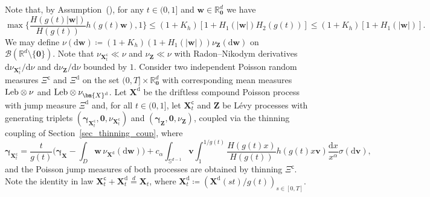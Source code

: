 \documentclass[en,oneside,bbfont,article]{amsart}
\theoremstyle{remark}
\theoremstyle{definition}
\theoremstyle{definition}
\newcommand\N{\mathbb{N}}
\newcommand\Sp{\mathbb{S}}
\newcommand\R{\mathbb{R}}
\newcommand\1{\mathds{1}}
\newcommand{\Borel}{\mathcal{B}}
\newcommand{\Leb}{\text{\normalfont Leb}}
\renewcommand\le{\leqslant}
\newcommand\eqd{\overset{d}{=}}
\newcommand\co{\mathsf{c}}
\newcommand{\D}{\mathrm{d}}
\begin{document}
Note that, by Assumption~(), for any $t\in(0,1]$ and $\bm{w}\in\R^d_{\bm0}$ we have
\begin{equation*}
\max\bigg\{\frac{H(g(t)|\bm{w}|)}{H(g(t))}h(g(t)\bm{w}),1\bigg\} 
\le (1+K_h)[1+H_1(|\bm{w}|)H_2(g(t))] 
\le (1+K_h)[1+H_1(|\bm{w}|)].
\end{equation*}
We may define $\nu(\D\bm{w})\coloneqq (1+K_h) (1+ H_1(|\bm{w}|))\nu_{\bm{Z}} (\D\bm{w})$ on $\Borel(\R^d\setminus\{\bm0\})$. Note that $\nu_{\bm{X}_t^\co}\ll\nu$ and $\nu_{\bm{Z}}\ll\nu$ with Radon--Nikodym derivatives $\D\nu_{\bm X_t^\co}/\D\nu$ and $\D\nu_{\bm Z}/\D\nu$ bounded by $1$. Consider two independent Poisson random measures $\Xi^\co$ %
and $\Xi^\D$ on the set $(0,T]\times \R^d_{\bm0}$ with corresponding mean measures $\Leb\otimes \nu$ and $\Leb\otimes \nu_{\bm{X}^\D}$. Let $\bm{X}^\D$ be the driftless compound Poisson process with jump measure $\Xi^\D$ and, for all $t\in(0,1]$, let $\bm{X}^\co_t$ and $\bm{Z}$ be L\'evy processes with generating triplets $(\bm{\gamma}_{\bm{X}^\co_t},\bm{0},\nu_{\bm{X}_t^\co})$ and $(\bm{\gamma}_{\bm{Z}},\bm{0},\nu_{\bm{Z}})$, coupled via the thinning coupling of Section~\ref{sec_thinning_coup}, where 
\[
\bm{\gamma}_{\bm{X}^\co_t}
=\frac{t}{g(t)}\bigg(\bm{\gamma}_{\bm{X}}
-\int_{D}\bm{w}\,\nu_{\bm{X}^\D}(\D\bm{w})
\bigg)
+ c_\alpha\int_{\Sp^{d-1}}\bm{v}\int_1^{1/g(t)}
\frac{H(g(t)x)}{H(g(t))}h(g(t)x\bm{v})
\frac{\D x}{x^{\alpha}}\sigma(\D\bm{v}),
\] 
and the Poisson jump measures of both processes are obtained by thinning $\Xi^\co$. Note the identity in law $\bm{X}^\co_t+\bm{X}^\D_t\eqd \bm{X}_t$, where $\bm{X}^\D_t\coloneqq (\bm{X}^\D(st)/g(t))_{s\in[0,T]}$. %
\end{document}
